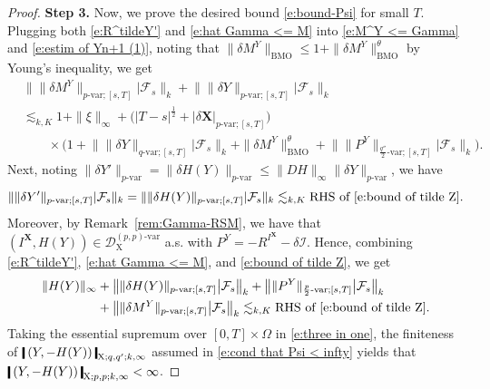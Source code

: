 \documentclass[11pt,reqno]{amsart}
\numberwithin{equation}{section}
\newcommand{\shortthickbar}{%
  \vcenter{\hbox{\rule{1.8pt}{2.2ex}}}%
}
\newcommand{\thicknm}[1]{%
  \mathopen{\shortthickbar}%
  \mkern4mu #1 \mkern4mu%
  \mathclose{\shortthickbar}%
}
\begin{document}
\begin{proof}
{\bf Step 3.} Now, we prove the desired bound \eqref{e:bound-Psi} for small $T$.
Plugging both \eqref{e:R^tildeY'} and \eqref{e:hat Gamma <= M} into \eqref{e:M^Y <= Gamma} and \eqref{e:estim of Yn+1 (1)}, 
noting that  $\|\delta M^Y\|_{\mathrm{BMO}} \le 1 + \|\delta M^{Y}\|^{\theta}_{\mathrm{BMO}}$ by Young's inequality, we get
\begin{equation}\label{e:bound of tilde Z}
\begin{aligned}
&\big\| \|\delta M^{Y}\|_{p\text{-var};[s,T]} \big| \mathcal F_{s}\big\|_{k} + \big\| \|\delta Y\|_{p\text{-var};[s,T]} \big| \mathcal F_{s}\big\|_{k} \\
&\lesssim_{k,K} 1 + \|\xi\|_{\infty} + \big(  |T-s|^{\frac{1}{2}} + |\delta \mathbf X|_{p\text{-}\mathrm{var};[s,T]} \big)\\
&\qquad \times \Big( 1 + \big\| \|\delta Y\|_{q\text{-var};[s,T]} \big| \mathcal F_{s} \big\|_{k} +  \|\delta M^{Y}\|^{\theta}_{\mathrm{BMO}} + \big\| \|P^Y\|_{\frac{q''}{2}\text{-}\mathrm{var};[s,T]} \big| \mathcal F_{s}\big\|_{k}\Big).
\end{aligned}
\end{equation}
Next, noting $\|\delta Y'\|_{p\text{-var}}=\|\delta H(Y)\|_{p\text{-var}} \le \|DH\|_\infty \|\delta Y\|_{p\text{-var}}$, we have 
\begin{equation*}
\|\|\delta Y'\|_{p\text{-var};[s,T]}|\mathcal F_{s}\|_{k}=\|\|\delta H(Y)\|_{p\text{-var};[s,T]}|\mathcal F_{s}\|_{k}\lesssim_{k,K} \text{RHS of \eqref{e:bound of tilde Z}}.
\end{equation*}
Moreover, by Remark~\ref{rem:Gamma-RSM}, we have that $(I^{\mathbf X},H(Y))\in\mathscr{D}^{(p,p)\text{-var}}_{\mathrm X}$ a.s. with $P^Y = - R^{I^{\mathbf X}} - \delta \mathcal I$. Hence, combining \eqref{e:R^tildeY'}, \eqref{e:hat Gamma <= M}, and \eqref{e:bound of tilde Z}, we get 
\begin{equation}\label{e:three in one}
\begin{aligned}
 \|H(Y)\|_{\infty}  &+ \big\| \|\delta H(Y)\|_{p\text{-var};[s,T]} \big| \mathcal F_{s} \big\|_{k} + \big\| \|P^Y\|_{\frac{p}{2}\text{-var};[s,T]} \big| \mathcal F_{s}\big\|_{k} \\
& + \big\| \|\delta M^{Y}\|_{p\text{-var};[s,T]} \big| \mathcal F_{s} \big\|_{k}\lesssim_{k,K} \text{RHS of \eqref{e:bound of tilde Z}}. 
\end{aligned}
\end{equation}
Taking the essential supremum over $[0,T]\times \Omega$ in \eqref{e:three in one}, the finiteness of $\thicknm{(Y,-H(Y))}_{\mathrm X;q,q';k,\infty} $ assumed in \eqref{e:cond that Psi < infty} 
yields that $\thicknm{(Y,-H(Y))}_{\mathrm X;p,p;k,\infty} < \infty$.


\end{proof}
\end{document}
